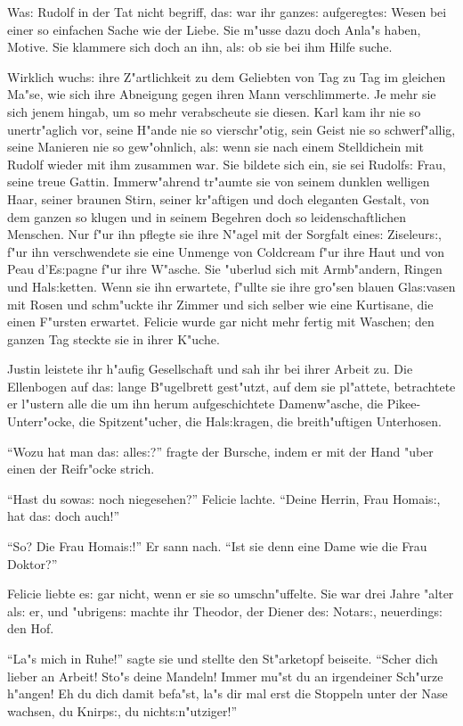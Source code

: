 \documentclass[oneside,12pt]{book}
\newcommand{\s}{s:}%
\begin{document}
Wa{\s} Rudolf in der Tat nicht begriff, da{\s} war ihr ganze{\s}
aufgeregte{\s} Wesen bei einer so einfachen Sache wie der Liebe.
Sie m"usse dazu doch Anla"s haben, Motive. Sie klammere sich doch
an ihn, al{\s} ob sie bei ihm Hilfe suche.

Wirklich wuch{\s} ihre Z"artlichkeit zu dem Geliebten von Tag zu
Tag im gleichen Ma"se, wie sich ihre Abneigung gegen ihren Mann
verschlimmerte. Je mehr sie sich jenem hingab, um so mehr
verabscheute sie diesen. Karl kam ihr nie so unertr"aglich vor,
seine H"ande nie so vierschr"otig, sein Geist nie so
schwerf"allig, seine Manieren nie so gew"ohnlich, al{\s} wenn sie
nach einem Stelldichein mit Rudolf wieder mit ihm zusammen war.
Sie bildete sich ein, sie sei Rudolf{\s} Frau, seine treue Gattin.
Immerw"ahrend tr"aumte sie von seinem dunklen welligen Haar,
seiner braunen Stirn, seiner kr"aftigen und doch eleganten
Gestalt, von dem ganzen so klugen und in seinem Begehren doch so
leidenschaftlichen Menschen. Nur f"ur ihn pflegte sie ihre N"agel
mit der Sorgfalt eine{\s} Ziseleur{\s}, f"ur ihn verschwendete sie
eine Unmenge von Coldcream f"ur ihre Haut und von Peau d'E{\s}pagne
f"ur ihre W"asche. Sie "uberlud sich mit Armb"andern, Ringen und
Hal{\s}ketten. Wenn sie ihn erwartete, f"ullte sie ihre gro"sen
blauen Gla{\s}vasen mit Rosen und schm"uckte ihr Zimmer und sich
selber wie eine Kurtisane, die einen F"ursten erwartet. Felicie
wurde gar nicht mehr fertig mit Waschen; den ganzen Tag steckte
sie in ihrer K"uche.

Justin leistete ihr h"aufig Gesellschaft und sah ihr bei ihrer
Arbeit zu. Die Ellenbogen auf da{\s} lange B"ugelbrett gest"utzt,
auf dem sie pl"attete, betrachtete er l"ustern alle die um ihn
herum aufgeschichtete Damenw"asche, die Pikee-Unterr"ocke, die
Spitzent"ucher, die Hal{\s}kragen, die breith"uftigen Unterhosen.

"`Wozu hat man da{\s} alle{\s}?"' fragte der Bursche, indem er mit
der Hand "uber einen der Reifr"ocke strich.

"`Hast du sowa{\s} noch niegesehen?"' Felicie lachte. "`Deine
Herrin, Frau Homai{\s}, hat da{\s} doch auch!"'

"`So? Die Frau Homai{\s}!"' Er sann nach. "`Ist sie denn eine Dame
wie die Frau Doktor?"'

Felicie liebte e{\s} gar nicht, wenn er sie so umschn"uffelte. Sie
war drei Jahre "alter al{\s} er, und "ubrigen{\s} machte ihr
Theodor, der Diener de{\s} Notar{\s}, neuerding{\s} den Hof.

"`La"s mich in Ruhe!"' sagte sie und stellte den St"arketopf
beiseite. "`Scher dich lieber an  Arbeit! Sto"s deine
Mandeln! Immer mu"st du an irgendeiner Sch"urze h"angen! Eh du
dich damit befa"st, la"s dir mal erst die Stoppeln unter der Nase
wachsen, du Knirp{\s}, du nicht{\s}n"utziger!"'
\end{document}
